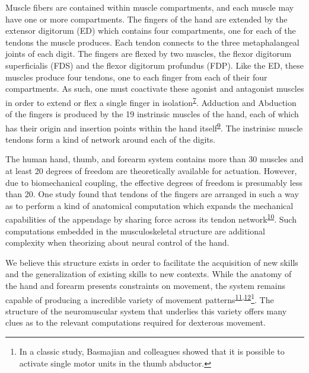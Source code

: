 \documentclass[
  a4paper,
]{article}
\begin{document}
Muscle fibers are contained within muscle compartments, and each muscle
may have one or more compartments. The fingers of the hand are extended
by the extensor digitorum (ED) which contains four compartments, one for
each of the tendons the muscle produces. Each tendon connects to the
three metaphalangeal joints of each digit. The fingers are flexed by two
muscles, the flexor digitorum superficialis (FDS) and the flexor
digitorum profundus (FDP). Like the ED, these muscles produce four
tendons, one to each finger from each of their four compartments. As
such, one must coactivate these agonist and antagonist muscles in order
to extend or flex a single finger in
isolation\textsuperscript{\protect\hyperlink{ref-fuglevandMechanicalPropertiesNeural2011}{7}}.
Adduction and Abduction of the fingers is produced by the 19 instrinsic
muscles of the hand, each of which has their origin and insertion points
within the hand
itself\textsuperscript{\protect\hyperlink{ref-vanduinenConstraintsControlHuman2011}{9}}.
The instrinisc muscle tendons form a kind of network around each of the
digits.

The human hand, thumb, and forearm system contains more than 30 muscles
and at least 20 degrees of freedom are theoretically available for
actuation. However, due to biomechanical coupling, the effective degrees
of freedom is presumably less than 20. One study found that tendons of
the fingers are arranged in such a way as to perform a kind of
anatomical computation which expands the mechanical capabilities of the
appendage by sharing force across its tendon
network\textsuperscript{\protect\hyperlink{ref-Valero-Cuevas2007}{10}}.
Such computations embedded in the musculoskeletal structure are
additional complexity when theorizing about neural control of the hand.

We believe this structure exists in order to facilitate the acquisition
of new skills and the generalization of existing skills to new contexts.
While the anatomy of the hand and forearm presents constraints on
movement, the system remains capable of producing a incredible variety
of movement
patterns\textsuperscript{\protect\hyperlink{ref-yanUnexpectedComplexityEveryday2020}{11},\protect\hyperlink{ref-Basmajian1963}{12}}\footnote{In
  a classic study, Basmajian and colleagues showed that it is possible
  to activate single motor units in the thumb abductor.}. The structure
of the neuromuscular system that underlies this variety offers many
clues as to the relevant computations required for dexterous movement.
\end{document}
